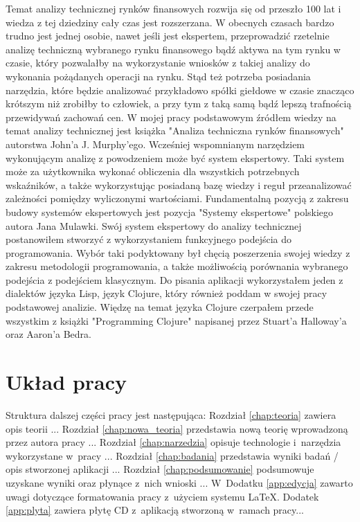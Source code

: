 Temat analizy technicznej rynków finansowych rozwija się od przeszło 100 lat i wiedza z tej dziedziny cały czas jest rozszerzana. W obecnych czasach bardzo trudno jest jednej osobie, nawet jeśli jest ekspertem, przeprowadzić rzetelnie analizę techniczną wybranego rynku finansowego bądź aktywa na tym rynku w czasie, który pozwalałby na wykorzystanie wniosków z takiej analizy do wykonania pożądanych operacji na rynku. Stąd też potrzeba posiadania narzędzia, które będzie analizować przykładowo spółki giełdowe w czasie znacząco krótszym niż zrobiłby to człowiek, a przy tym z taką samą bądź lepszą trafnością przewidywań zachowań cen. W mojej pracy podstawowym źródłem wiedzy na temat analizy technicznej jest książka "Analiza techniczna rynków finansowych" \cite {analiza} autorstwa John'a J. Murphy'ego. Wcześniej wspomnianym narzędziem wykonującym analizę z powodzeniem może być system ekspertowy. Taki system może za użytkownika wykonać obliczenia dla wszystkich potrzebnych wskaźników, a także wykorzystując posiadaną bazę wiedzy i reguł przeanalizować zależności pomiędzy wyliczonymi wartościami. Fundamentalną pozycją z zakresu budowy systemów ekspertowych jest pozycja "Systemy ekspertowe" \cite {mulawka} polskiego autora Jana Mulawki. Swój system ekspertowy do analizy technicznej postanowiłem stworzyć z wykorzystaniem funkcyjnego podejścia do programowania. Wybór taki podyktowany był chęcią poszerzenia swojej wiedzy z zakresu metodologii programowania, a także możliwością porównania wybranego podejścia z podejściem klasycznym. Do pisania aplikacji wykorzystałem jeden z dialektów języka Lisp, język Clojure, który również poddam w swojej pracy podstawowej analizie. Więdzę na temat języka Clojure czerpałem przede wszystkim z książki "Programming Clojure" \cite {clojure} napisanej przez Stuart'a Halloway'a oraz Aaron'a Bedra.

\section{Układ pracy}

Struktura dalszej części pracy jest następująca: Rozdział \ref{chap:teoria} zawiera opis teorii ... Rozdział \ref{chap:nowa_teoria} przedstawia nową teorię wprowadzoną przez autora pracy ... Rozdział \ref{chap:narzedzia} opisuje technologie i~narzędzia wykorzystane w~pracy ...  Rozdział \ref{chap:badania} przedstawia wyniki badań / opis stworzonej aplikacji ... Rozdział \ref{chap:podsumowanie} podsumowuje uzyskane wyniki oraz płynące z~nich wnioski ... W~Dodatku \ref{app:edycja} zawarto uwagi dotyczące formatowania pracy z~użyciem systemu \LaTeX. Dodatek \ref{app:plyta} zawiera płytę CD z~aplikacją stworzoną w~ramach pracy...